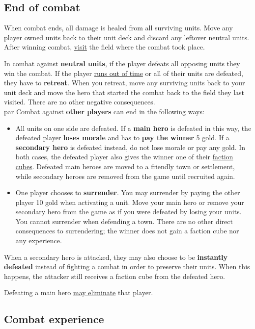 \documentclass[12pt]{article}
\begin{document}
\subsection*{\hypertarget{Endcombat}{End of combat}}
When combat ends, all damage is healed from all surviving units. Move any player owned units back to their unit deck and discard any leftover neutral units. After winning combat, \hyperlink{Categories}{visit} the field where the combat took place.\par
In combat against \textbf{neutral units}, if the player defeats all opposing units they win the combat. If the player \hyperlink{Timelimit}{runs out of time} or all of their units are defeated, they have to \textbf{retreat}. When you retreat, move any surviving units back to your unit deck and move the hero that started the combat back to the field they last visited. There are no other negative consequences.\\par
Combat against \textbf{other players} can end in the following ways:
\begin{itemize}
    \item All units on one side are defeated. If a \textbf{main hero} is defeated in this way, the defeated player \textbf{loses morale} and has to \textbf{pay the winner} 5 gold. If a \textbf{secondary hero} is defeated instead, do not lose morale or pay any gold. In both cases, the defeated player also gives the winner one of their \hyperlink{End}{faction cubes}. Defeated main heroes are moved to a friendly town or settlement, while secondary heroes are removed from the game until recruited again.
    \item One player chooses to \textbf{surrender}. You may surrender by paying the other player 10 gold when activating a unit. Move your main hero or remove your secondary hero from the game as if you were defeated by losing your units. You cannot surrender when defending a town. There are no other direct consequences to surrendering; the winner does not gain a faction cube nor any experience.
\end{itemize}
 When a secondary hero is attacked, they may also choose to be \textbf{instantly defeated} instead of fighting a combat in order to preserve their units. When this happens, the attacker still receives a faction cube from the defeated hero.\par Defeating a main hero \hyperlink{End}{may eliminate} that player.

\subsection*{\hypertarget{Combatexperience}{Combat experience}}
\end{document}
